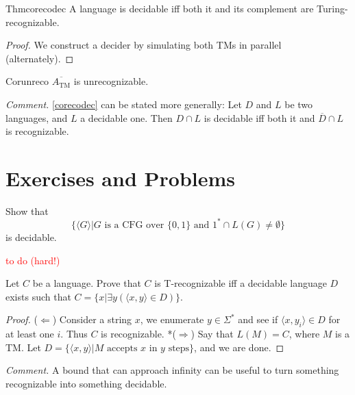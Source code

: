 \begin{reference}{Thm}{corecodec}
  A language is decidable iff both it and its complement are Turing-recognizable.
\end{reference}

\begin{proof}
  We construct a decider by simulating both TMs in parallel (alternately).
\end{proof}

\begin{reference}{Cor}{unreco}
  $\overline{A_{\mathrm{TM}}}$ is unrecognizable.
\end{reference}

\textit{Comment.} \ref{corecodec} can be stated more generally: Let $D$ and $L$ be two languages, and $L$ a decidable one. Then $D\cap L$ is decidable iff both it and $\overline{D}\cap L$ is recognizable.

\section*{Exercises and Problems}

\setcounter{exercise}{13}

\begin{exercise}{4.14}
  Show that
  \[
    \{\langle G\rangle|G\text{ is a CFG over }\{0,1\}\text{ and }1^*\cap L(G)\neq\emptyset\}
  \]
  is decidable.
\end{exercise}

\textcolor{red}{to do (hard!)}

\setcounter{exercise}{17}

\begin{exercise}{4.18}
  Let $C$ be a language. Prove that $C$ is T-recognizable iff a decidable language $D$ exists such that $C=\{x|\exists y(\langle x,y\rangle\in D)\}$.
\end{exercise}

\begin{proof}
  ($\Leftarrow$) Consider a string $x$, we enumerate $y\in \Sigma^*$ and see if $\langle x,y_i\rangle\in D$ for at least one $i$. Thus $C$ is recognizable. *($\Rightarrow$) Say that $L(M)=C$, where $M$ is a TM. Let $D=\{\langle x,y\rangle|M\text{ accepts }x\text{ in }y\text{ steps}\}$, and we are done.
\end{proof}

\textit{Comment.} A bound that can approach infinity can be useful to turn something recognizable into something decidable.

\setcounter{exercise}{23}

